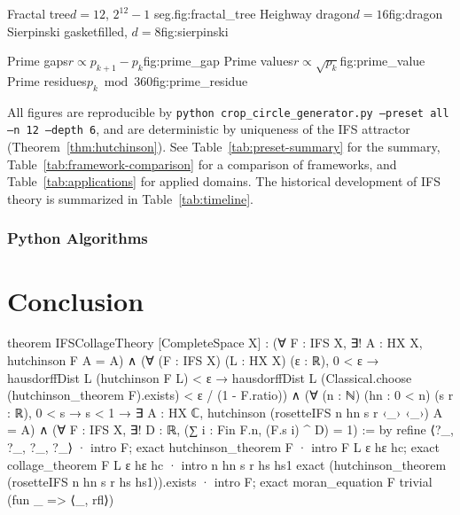 \documentclass[10pt]{amsart}
\theoremstyle{break}
\begin{document}
\vspace{2em}
\noindent
{}%
{Fractal tree}{$d=12$, $2^{12}-1$ seg.}{fig:fractal_tree}%
\hfill
{}%
{Heighway dragon}{$d=16$}{fig:dragon}%
\hfill
{}%
{Sierpinski gasket}{filled, $d=8$}{fig:sierpinski}

\vspace{2em}
\noindent
{}%
{Prime gaps}{$r\propto p_{k+1}-p_k$}{fig:prime_gap}%
\hfill
{}%
{Prime values}{$r\propto\sqrt{p_k}$}{fig:prime_value}%
\hfill
{}%
{Prime residues}{$p_k \bmod 360$}{fig:prime_residue}

\vspace{2em}
\noindent
All figures are reproducible by
\texttt{python crop\_circle\_generator.py --preset all --n 12 --depth 6},
and are deterministic by uniqueness of the IFS attractor
(Theorem~\ref{thm:hutchinson}). See
Table~\ref{tab:preset-summary} for the summary,
Table~\ref{tab:framework-comparison} for a comparison of frameworks,
and Table~\ref{tab:applications} for applied domains.
The historical development of IFS theory is summarized in
Table~\ref{tab:timeline}.

\subsubsection*{Python Algorithms}



\newpage
\section{Conclusion}

\begin{leanlisting}
	theorem IFSCollageTheory [CompleteSpace X] :
	  (∀ F : IFS X, ∃! A : HX X, hutchinson F A = A) ∧
	  (∀ (F : IFS X) (L : HX X) (ε : ℝ), 0 < ε →
	     hausdorffDist L (hutchinson F L) < ε →
	     hausdorffDist L (Classical.choose (hutchinson_theorem F).exists)
	       < ε / (1 - F.ratio)) ∧
	  (∀ (n : ℕ) (hn : 0 < n) (s r : ℝ), 0 < s → s < 1 →
	     ∃ A : HX ℂ, hutchinson (rosetteIFS n hn s r ‹_› ‹_›) A = A) ∧
	  (∀ F : IFS X, ∃! D : ℝ, (∑ i : Fin F.n, (F.s i) ^ D) = 1) :=
	by
	  refine ⟨?_, ?_, ?_, ?_⟩
	  · intro F; exact hutchinson_theorem F
	  · intro F L ε hε hc; exact collage_theorem F L ε hε hc
	  · intro n hn s r hs hs1
	    exact (hutchinson_theorem (rosetteIFS n hn s r hs hs1)).exists
	  · intro F; exact moran_equation F trivial (fun _ => ⟨_, rfl⟩)
\end{leanlisting}

\vspace{0.5in}
\begingroup
\renewcommand{\bibliofont}{\fontsize{7pt}{9pt}\selectfont}
\nocite{*}


\endgroup
\end{document}
